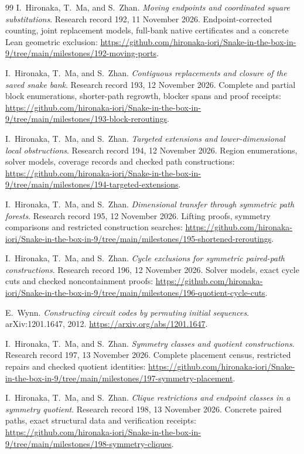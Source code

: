 \documentclass[11pt,a4paper]{article}
\theoremstyle{definition}
\theoremstyle{remark}
\begin{document}
\begin{thebibliography}{99}
I.~Hironaka, T.~Ma, and S.~Zhan. \emph{Moving endpoints and coordinated square substitutions}. Research record 192, 11 November 2026. Endpoint-corrected counting, joint replacement models, full-bank native certificates and a concrete Lean geometric exclusion:
\url{https://github.com/hironaka-iori/Snake-in-the-box-in-9/tree/main/milestones/192-moving-ports}.

I.~Hironaka, T.~Ma, and S.~Zhan. \emph{Contiguous replacements and closure of the saved snake bank}. Research record 193, 12 November 2026. Complete and partial block enumerations, shorter-path regrowth, blocker spans and proof receipts:
\url{https://github.com/hironaka-iori/Snake-in-the-box-in-9/tree/main/milestones/193-block-reroutings}.

I.~Hironaka, T.~Ma, and S.~Zhan. \emph{Targeted extensions and lower-dimensional local obstructions}. Research record 194, 12 November 2026. Region enumerations, solver models, coverage records and checked path constructions:
\url{https://github.com/hironaka-iori/Snake-in-the-box-in-9/tree/main/milestones/194-targeted-extensions}.

I.~Hironaka, T.~Ma, and S.~Zhan. \emph{Dimensional transfer through symmetric path forests}. Research record 195, 12 November 2026. Lifting proofs, symmetry comparisons and restricted construction searches:
\url{https://github.com/hironaka-iori/Snake-in-the-box-in-9/tree/main/milestones/195-shortened-reroutings}.

I.~Hironaka, T.~Ma, and S.~Zhan. \emph{Cycle exclusions for symmetric paired-path constructions}. Research record 196, 12 November 2026. Solver models, exact cycle cuts and checked noncontainment proofs:
\url{https://github.com/hironaka-iori/Snake-in-the-box-in-9/tree/main/milestones/196-quotient-cycle-cuts}.

E.~Wynn. \emph{Constructing circuit codes by permuting initial sequences}.
arXiv:1201.1647, 2012. \url{https://arxiv.org/abs/1201.1647}.

I.~Hironaka, T.~Ma, and S.~Zhan. \emph{Symmetry classes and quotient constructions}.
Research record 197, 13 November 2026. Complete placement census,
restricted repairs and checked quotient identities:
\url{https://github.com/hironaka-iori/Snake-in-the-box-in-9/tree/main/milestones/197-symmetry-placement}.

I.~Hironaka, T.~Ma, and S.~Zhan. \emph{Clique restrictions and endpoint classes in a symmetry quotient}.
Research record 198, 13 November 2026. Concrete paired paths, exact structural data and verification receipts:
\url{https://github.com/hironaka-iori/Snake-in-the-box-in-9/tree/main/milestones/198-symmetry-cliques}.



\end{thebibliography}
\end{document}
